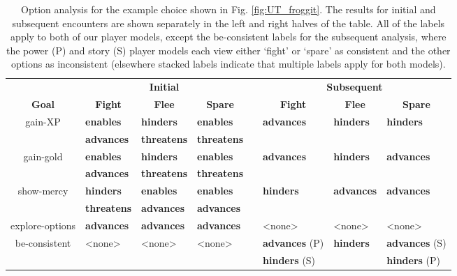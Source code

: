 \documentclass[arts,article,submit,moreauthors,pdftex,10pt,a4paper]{Definitions/mdpi}
\newcommand{\enables}{\textbf{\color{enables}enables}}
\newcommand{\advances}{\textbf{\color{advances}advances}}
\newcommand{\threatens}{\textbf{\color{threatens}threatens}}
\newcommand{\hinders}{\textbf{\color{hinders}hinders}}
\begin{document}
\begin{table}[H]
\centering
\begin{tabular}{c l l l c l l l}
  \toprule
  & \multicolumn{3}{c}{\textbf{Initial}} && \multicolumn{3}{c}{\textbf{Subsequent}} \\
  \cmidrule(r){1-1} \cmidrule{2-4} \cmidrule{6-8}
  \textbf{Goal} & \multicolumn{1}{c}{\textbf{Fight}} & \multicolumn{1}{c}{\textbf{Flee}} & \multicolumn{1}{c}{\textbf{Spare}} && \multicolumn{1}{c}{\textbf{Fight}} & \multicolumn{1}{c}{\textbf{Flee}} & \multicolumn{1}{c}{\textbf{Spare}} \\
  \cmidrule(r){1-1} \cmidrule{2-4} \cmidrule{6-8}
  \multirow{2}{7em}{\centering gain-XP} & \enables{} & \hinders{} & \enables{} && \multirow{2}{4.5em}{\advances{}} & \multirow{2}{4.5em}{\hinders{}} & \multirow{2}{4.5em}{\hinders{}} \\
                                        & \advances{} & \threatens{} & \threatens{} && & & \\
  \cmidrule(r){1-1} \cmidrule{2-4} \cmidrule{6-8}
  \multirow{2}{7em}{\centering gain-gold} & \enables{} & \hinders{} & \enables{} && \multirow{2}{4.5em}{\advances{}} & \multirow{2}{4.5em}{\hinders{}} & \multirow{2}{4.5em}{\advances{}} \\
                                          & \advances{} & \threatens{} & \threatens{} && & & \\
  \cmidrule(r){1-1} \cmidrule{2-4} \cmidrule{6-8}
  \multirow{2}{7em}{\centering show-mercy} & \hinders{} & \enables{} & \enables{} && \multirow{2}{4.5em}{\hinders{}} & \multirow{2}{4.5em}{\advances{}} & \multirow{2}{4.5em}{\advances{}} \\
                                          & \threatens{} & \advances{} & \advances{} \\
  \cmidrule(r){1-1} \cmidrule{2-4} \cmidrule{6-8}
  explore-options & \advances{} & \advances{} & \advances{} && <none> & <none> & <none> \\
  \cmidrule(r){1-1} \cmidrule{2-4} \cmidrule{6-8}
  \multirow{2}{7em}{\centering be-consistent} & \multirow{2}{4.5em}{<none>} & \multirow{2}{4.5em}{<none>} & \multirow{2}{4.5em}{<none>} && \advances{} (P) & \multirow{2}{4.5em}{\hinders{}} & \advances{} (S) \\
  & & & && \hinders{} (S) & & \hinders{} (P) \\
  \bottomrule
\end{tabular}
  \caption[\emph{Undertale}option analysis]{Option analysis for the example choice shown in Fig. \ref{fig:UT_froggit}. The results for initial and subsequent encounters are shown separately in the left and right halves of the table. All of the labels apply to both of our player models, except the be-consistent labels for the subsequent analysis, where the power (P) and story (S) player models each view either `fight' or `spare' as consistent and the other options as inconsistent (elsewhere stacked labels indicate that multiple labels apply for both models).}
\label{tab:UT_options}
\end{table}
\end{document}
